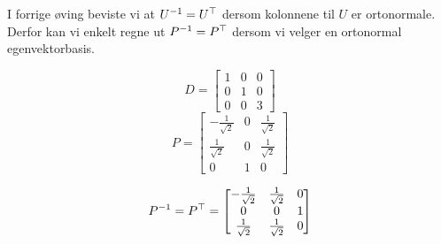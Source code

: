 \begin{losning}
\begin{punkt}
I forrige øving beviste vi at $U^{-1}=U^\top$ dersom kolonnene til $U$ er ortonormale. Derfor kan vi enkelt regne ut $P^{-1}=P^\top$ dersom vi velger en ortonormal egenvektorbasis. 
\end{punkt}

\begin{punkt}
$$D=\begin{bmatrix}
1 & 0 & 0\\
0 & 1 & 0\\
0 & 0 & 3
\end{bmatrix}$$ $$P=\begin{bmatrix}
-\frac{1}{\sqrt{2}} & 0 & \frac{1}{\sqrt{2}}\\
\frac{1}{\sqrt{2}} & 0 & \frac{1}{\sqrt{2}}\\
0 & 1 & 0
\end{bmatrix}$$

$$P^{-1}=P^\top=\begin{bmatrix}
-\frac{1}{\sqrt{2}} & \frac{1}{\sqrt{2}} & 0\\
0 & 0 & 1\\
\frac{1}{\sqrt{2}} & \frac{1}{\sqrt{2}} & 0
\end{bmatrix}$$
\end{punkt}

\end{losning}
